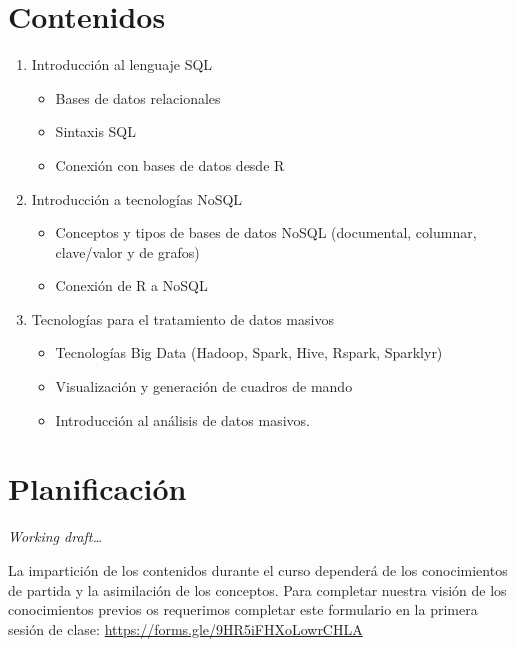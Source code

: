 \documentclass[]{book}
\providecommand{\tightlist}{%
  \setlength{\itemsep}{0pt}\setlength{\parskip}{0pt}}
\begin{document}
\hypertarget{contenidos}{%
\section{Contenidos}\label{contenidos}}

\begin{enumerate}
\def\labelenumi{\arabic{enumi}.}
\tightlist
\item
  Introducción al lenguaje SQL

  \begin{itemize}
  \tightlist
  \item
    Bases de datos relacionales
  \item
    Sintaxis SQL
  \item
    Conexión con bases de datos desde R
  \end{itemize}
\item
  Introducción a tecnologías NoSQL

  \begin{itemize}
  \tightlist
  \item
    Conceptos y tipos de bases de datos NoSQL (documental, columnar, clave/valor y de grafos)
  \item
    Conexión de R a NoSQL
  \end{itemize}
\item
  Tecnologías para el tratamiento de datos masivos

  \begin{itemize}
  \tightlist
  \item
    Tecnologías Big Data (Hadoop, Spark, Hive, Rspark, Sparklyr)
  \item
    Visualización y generación de cuadros de mando
  \item
    Introducción al análisis de datos masivos.
  \end{itemize}
\end{enumerate}

\hypertarget{planificacion}{%
\section{Planificación}\label{planificacion}}

\emph{Working draft\ldots{}}

La impartición de los contenidos durante el curso dependerá de los conocimientos de partida y la asimilación de los
conceptos. Para completar nuestra visión de los conocimientos previos os requerimos completar este formulario en la primera sesión de clase: \url{https://forms.gle/9HR5iFHXoLowrCHLA}
\end{document}
